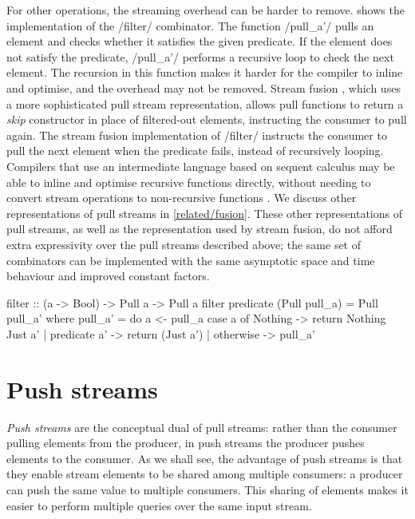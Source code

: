 For other operations, the streaming overhead can be harder to remove.
 shows the implementation of the \Hs/filter/ combinator.
The function \Hs/pull_a'/ pulls an element and checks whether it satisfies the given predicate.
If the element does not satisfy the predicate, \Hs/pull_a'/ performs a recursive loop to check the next element.
The recursion in this function makes it harder for the compiler to inline and optimise, and the overhead may not be removed. %
Stream fusion \citep{coutts2007stream}, which uses a more sophisticated pull stream representation, allows pull functions to return a \emph{skip} constructor in place of filtered-out elements, instructing the consumer to pull again.
The stream fusion implementation of \Hs/filter/ instructs the consumer to pull the next element when the predicate fails, instead of recursively looping.
Compilers that use an intermediate language based on sequent calculus may be able to inline and optimise recursive functions directly, without needing to convert stream operations to non-recursive functions \citep{maurer2017compiling}.
We discuss other representations of pull streams in \cref{related/fusion}.
These other representations of pull streams, as well as the representation used by stream fusion, do not afford extra expressivity over the pull streams described above; the same set of combinators can be implemented with the same asymptotic space and time behaviour and improved constant factors.

\begin{haskell}[float,caption=Pull implementation of \Hs/filter/,label=figs/impl/pull/filter]
filter :: (a -> Bool) -> Pull a -> Pull a
filter predicate (Pull pull_a) = Pull pull_a'
 where
  pull_a' = do
    a <- pull_a
    case a of
     Nothing -> return Nothing
     Just a'
      | predicate a' -> return (Just a')
      | otherwise    -> pull_a'
\end{haskell}



\section{Push streams}
\label{taxonomy/push}

\emph{Push streams} are the conceptual dual of pull streams: rather than the consumer pulling elements from the producer, in push streams the producer pushes elements to the consumer.
As we shall see, the advantage of push streams is that they enable stream elements to be shared among multiple consumers: a producer can push the same value to multiple consumers.
This sharing of elements makes it easier to perform multiple queries over the same input stream.

